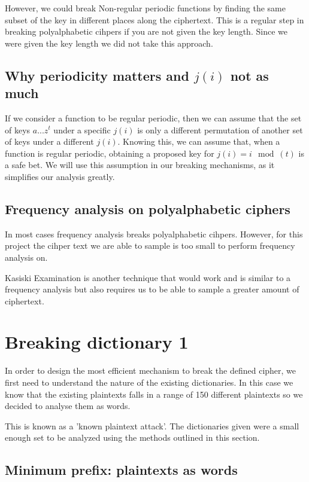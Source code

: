 \documentclass[pdftex,12pt,letter]{article}
\begin{document}
However, we could break Non-regular periodic functions by finding the same subset of the key in different places 
along the ciphertext. This is a regular step in breaking polyalphabetic cihpers if you are 
not given the key length. Since we were given the key length we did not take this approach.   

\subsection{Why periodicity matters and $j(i)$ not as much}

If we consider a function to be regular periodic, then we can assume that the 
set of keys ${a...z}^t$ under a specific $j(i)$ is only a different permutation
of another set of keys under a different $j(i)$. Knowing this, we can
assume that, when a function is regular periodic, obtaining a proposed key for
$j(i) = i \mod(t)$ is a safe bet. We will use this assumption in our breaking 
mechanisms, as it simplifies our analysis greatly.

\subsection{Frequency analysis on polyalphabetic ciphers}

In most cases frequency analysis breaks polyalphabetic cihpers. However,
for this project the cihper text we are able to sample is too small to 
perform frequency analysis on. 



Kasiski Examination is another technique that would work and is similar to 
a frequency analysis but also requires us to be able to sample a greater amount 
of ciphertext.


\section{Breaking dictionary 1}

In order to design the most efficient mechanism to break the defined cipher, we 
first need to understand the nature of the existing dictionaries. In this case
we know that the existing plaintexts falls in a range of 150 different plaintexts
so we decided to analyse them as words.

This is known as a 'known plaintext attack'. The dictionaries given were a small 
enough set to be analyzed using the methods outlined in this section. 

\subsection{Minimum prefix: plaintexts as words}
\end{document}
